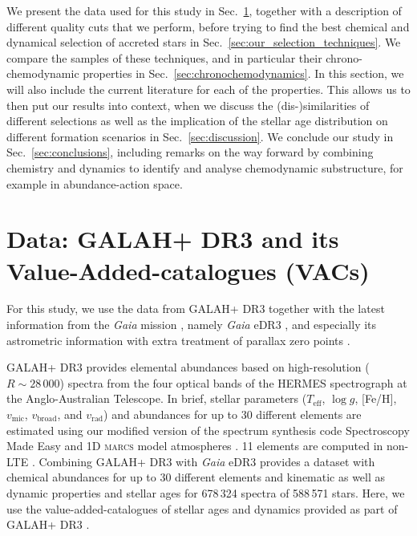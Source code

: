 \documentclass[fleqn,usenatbib]{mnras}
\newcommand{\Gaia}{\textit{Gaia}\xspace} %
\begin{document}
We present the data used for this study in Sec.~\ref{sec:data}, together with a description of different quality cuts that we perform, before trying to find the best chemical and dynamical selection of accreted stars in Sec.~\ref{sec:our_selection_techniques}. We compare the samples of these techniques, and in particular their chrono-chemodynamic properties in Sec.~\ref{sec:chronochemodynamics}. In this section, we will also include the current literature for each of the properties. This allows us to then put our results into context, when we discuss the (dis-)similarities of different selections as well as the implication of the stellar age distribution on different formation scenarios in Sec.~\ref{sec:discussion}. We conclude our study in Sec.~\ref{sec:conclusions}, including remarks on the way forward by combining chemistry and dynamics to identify and analyse chemodynamic substructure, for example in abundance-action space.

\section{Data: GALAH+ DR3 and its Value-Added-catalogues (VACs)} \label{sec:data}

For this study, we use the data from GALAH+ DR3 \citep{Buder2021} together with the latest information from the \Gaia mission \citep{Gaia-Collaboration2016}, namely \Gaia eDR3 \citep{Brown2021}, and especially its astrometric information with extra treatment of parallax zero points \citep{Lindegren2021a, Lindegren2021b}.

GALAH+ DR3 provides elemental abundances based on high-resolution ($R \sim 28\,000$) spectra from the four optical bands of the HERMES spectrograph \citep{Sheinis2015} at the Anglo-Australian Telescope. In brief, stellar parameters ($T_\text{eff}$, $\log g$, [Fe/H], $v_\text{mic}$, $v_\text{broad}$, and $v_\text{rad}$) and abundances for up to 30 different elements are estimated using our modified version of the spectrum synthesis code Spectroscopy Made Easy \citep[\textsc{sme}][]{Valenti1996, Piskunov2017} and 1D \textsc{marcs} model atmospheres \citep{Gustafsson2008}. 11 elements are computed in non-LTE \citep{Amarsi2020}. Combining GALAH+ DR3 with \Gaia eDR3 provides a dataset with chemical abundances for up to 30 different elements and kinematic as well as dynamic properties and stellar ages for 678\,324 spectra of 588\,571 stars. Here, we use the value-added-catalogues of stellar ages and dynamics provided as part of GALAH+ DR3 \citep{Buder2021}.
\end{document}
